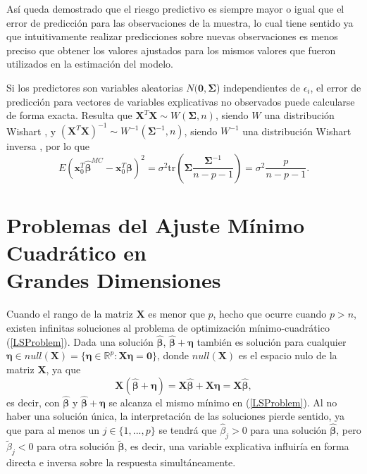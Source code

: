 \documentclass[a4paper,12pt]{report}
\begin{document}
Así queda demostrado que el riesgo predictivo es siempre mayor o igual que el error de predicción para las observaciones de la muestra, lo cual tiene sentido ya que intuitivamente realizar predicciones sobre nuevas observaciones es menos preciso que obtener los valores ajustados para los mismos valores que fueron utilizados en la estimación del modelo.

Si los predictores son variables aleatorias $N(\boldsymbol{0},\boldsymbol{\Sigma}$) independientes de $\epsilon_i$, el error de predicción para vectores de variables explicativas no observados puede calcularse de forma exacta. Resulta que $\boldsymbol{X}^T\boldsymbol{X} \sim W(\boldsymbol{\Sigma},n)$, siendo $W$ una distribución Wishart \citep{wishart1928generalised}, y $(\boldsymbol{X}^T\boldsymbol{X})^{-1} \sim W^{-1}(\boldsymbol{\Sigma}^{-1},n)$, siendo $W^{-1}$ una distribución Wishart inversa \citep{haff1979identity}, por lo que
\begin{equation}
E(\boldsymbol{x}_0^T\boldsymbol{\hat{\beta}}^{MC}-\boldsymbol{x}_0^T\boldsymbol{\beta})^2=\sigma^2\text{tr}\left(\boldsymbol{\Sigma} \frac{\boldsymbol{\Sigma}^{-1}}{n-p-1}\right)=\sigma^2\frac{p}{n-p-1}.
\end{equation}

{
\section[Problemas del Ajuste Mínimo Cuadrático en Grandes Dimensiones]{Problemas del Ajuste Mínimo Cuadrático en \\ Grandes Dimensiones}}
Cuando el rango de la matriz $\boldsymbol{X}$ es menor que $p$, hecho que ocurre cuando $p > n$, existen infinitas soluciones al problema de optimización mínimo-cuadrático (\ref{LSProblem}). Dada una solución $\boldsymbol{\hat{\beta}}$, $\boldsymbol{\hat{\beta}} + \boldsymbol{\eta}$ también es solución para cualquier $\boldsymbol{\eta} \in null(\boldsymbol{X})=\{\boldsymbol{\eta} \in \mathbb{R}^p: \boldsymbol{X}\boldsymbol{\eta}=\boldsymbol{0}\}$, donde $null(\boldsymbol{X})$ es el espacio nulo de la matriz $\boldsymbol{X}$, ya que 
\begin{equation}
\boldsymbol{X}(\boldsymbol{\hat{\beta}} + \boldsymbol{\eta})=\boldsymbol{X}\boldsymbol{\hat{\beta}}+ \boldsymbol{X}\boldsymbol{\eta}=\boldsymbol{X}\boldsymbol{\hat{\beta}},
\end{equation}
es decir, con $\boldsymbol{\hat{\beta}}$ y $\boldsymbol{\hat{\beta}} + \boldsymbol{\eta}$ se alcanza el mismo mínimo en (\ref{LSProblem}). Al no haber una solución única, la interpretación de las soluciones pierde sentido, ya que para al menos un $j\in \{1,...,p\}$ se tendrá que $\hat{\beta}_j>0$ para una solución $\boldsymbol{\hat{\beta}}$, pero $\tilde{\beta}_j<0$ para otra solución $\boldsymbol{\tilde{\beta}}$, es decir, una variable explicativa influiría en forma directa e inversa sobre la respuesta simultáneamente.
\end{document}
